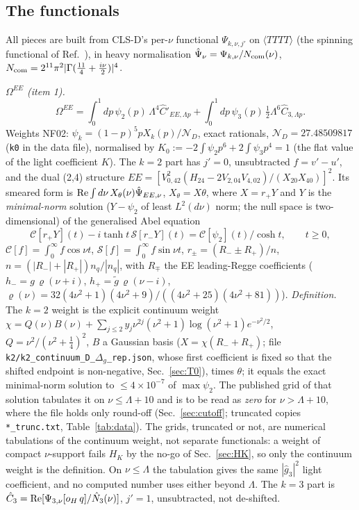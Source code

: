 \documentclass[aps,prl,onecolumn,superscriptaddress,nofootinbib]{revtex4-2}
\begin{document}
\subsection{The functionals}
All pieces are built from CLS-D's per-$\nu$ functional $\Psi_{k,\nu,j'}$ on $\langle TTTT\rangle$
(the spinning functional of Ref.~\cite{CLSD}), in heavy normalisation
$\hat\Psi_\nu=\Psi_{k,\nu}/N_{\rm com}(\nu)$, $N_{\rm com}=2^{11}\pi^2|\Gamma(\tfrac{11}{4}+\tfrac{i\nu}{2})|^4$.

\emph{$\Omega^{EE}$ (item 1).}
\begin{equation}
\Omega^{EE}=\int_0^1\!dp\,\psi_2(p)\,\Lambda^4\hat C'_{EE,\Lambda p}+\int_0^1\!dp\,\psi_3(p)\,\tfrac12\Lambda^6\hat C_{3,\Lambda p}.
\end{equation}
Weights NF02: $\psi_k=(1-p)^5pX_k(p)/\mathcal N_D$, exact rationals, $\mathcal N_D=27.48509817$ (\texttt{k0} in the data
file), normalised by $K_0:=-2\!\int\!\psi_2p^6+2\!\int\!\psi_3p^4=1$ (the flat value of the light coefficient $K$). The $k=2$ part has $j'=0$, unsubtracted
$f=v'-u'$, and the dual (2,4) structure
$EE=[V_{0,42}^2(H_{24}-2V_{2,04}V_{4,02})/(X_{20}X_{40})]^2$. Its smeared form is
${\rm Re}\int d\nu\,X_\theta(\nu)\hat\Psi_{EE,\nu}$, $X_\theta=X\theta$, where $X=r_+Y$ and $Y$ is the
\emph{minimal-norm} solution ($Y-\psi_2$ of least $L^2(d\nu)$ norm; the null space is
two-dimensional) of the generalised Abel equation
\begin{equation}
\mathcal C[r_+Y](t)-i\tanh t\,\mathcal S[r_-Y](t)=\mathcal C[\psi_2](t)/\cosh t,\qquad t\ge0,
\label{eq:abel}
\end{equation}
$\mathcal C[f]=\int_0^\infty f\cos\nu t$, $\mathcal S[f]=\int_0^\infty f\sin\nu t$,
$r_\pm=(R_-\pm R_+)/n$, $n=(|R_-|+|R_+|)n_q/|n_q|$, with $R_\mp$ the EE leading-Regge
coefficients ($h_-=g\,\varrho(\nu+i)$, $h_+=\tilde g\,\varrho(\nu-i)$,
$\varrho(\nu)=32(4\nu^2+1)(4\nu^2+9)/((4\nu^2+25)(4\nu^2+81))$). \emph{Definition.} The $k=2$ weight is the explicit
continuum weight
$\chi=Q(\nu)B(\nu)+\sum_{j\le2}y_j\nu^{2j}(\nu^2+1)\log(\nu^2+1)e^{-\nu^2/2}$, $Q=\nu^2/(\nu^2+\tfrac14)^2$,
$B$ a Gaussian basis ($X=\chi(R_-+R_+)$; file \texttt{k2/k2\_continuum\_D\_}$\Delta_g$\texttt{\_rep.json}, whose first coefficient is fixed so that the shifted endpoint is non-negative, Sec.~\ref{sec:T0}), times $\theta$; it equals the
exact minimal-norm solution to $\le4\times10^{-7}$ of $\max\psi_2$. The published grid of that solution tabulates it on
$\nu\le\Lambda+10$ and is to be read as \emph{zero} for $\nu>\Lambda+10$, where the file holds only round-off
(Sec.~\ref{sec:cutoff}; truncated copies \texttt{*\_trunc.txt}, Table~\ref{tab:data}). The grids, truncated or not, are
numerical tabulations of the continuum weight, not separate functionals: a weight of compact $\nu$-support fails $H_K$ by the
no-go of Sec.~\ref{sec:HK}, so only the continuum weight is the definition. On $\nu\le\Lambda$ the tabulation gives the same
$|\hat g_3|^2$ light coefficient, and no computed number uses either beyond $\Lambda$. The $k=3$ part is
$\hat C_3={\rm Re}[\Psi_{3,\nu}[o_H\,q]/\hat N_3(\nu)]$, $j'=1$, unsubtracted, not de-shifted.
\end{document}
